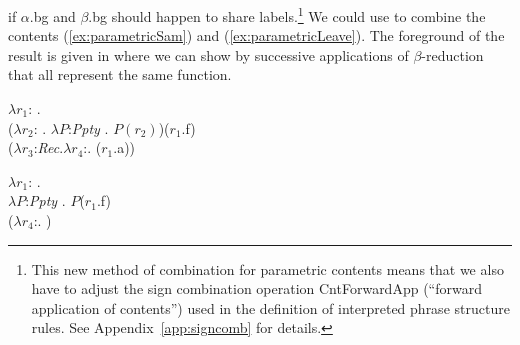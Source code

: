 if $\alpha$.bg and $\beta$.bg should happen to share
labels.\footnote{This new method of combination for parametric
  contents means that we also have to adjust the sign combination operation
  CntForwardApp (``forward application of contents'') used in the
  definition of interpreted phrase structure rules.  See
  Appendix~\ref{app:signcomb} for details.}  We could use
\preveg{} to combine the contents (\ref{ex:parametricSam}) and
(\ref{ex:parametricLeave}).  The foreground of the result is given in \nexteg{} where we can
show by successive applications of $\beta$-reduction that
 all represent the same function.



\begin{ex} 
\begin{subex} 
 
\item $\lambda
  r_1$: . \\
\hspace*{2em}($\lambda r_2$: . $\lambda P$:\textit{Ppty} . $P(r_2)$)($r_1$.f)\\
\hspace*{4em}($\lambda r_3$:\textit{Rec}.$\lambda r_4$:.
($r_1$.a)) 
 
\item  $\lambda
  r_1$: . \\
\hspace*{2em}$\lambda P$:\textit{Ppty} . $P$($r_1$.f)\\
\hspace*{4em}($\lambda r_4$:.
) 


\end{subex}
\end{ex}
